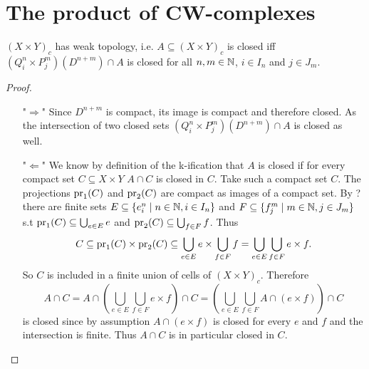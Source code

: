 \section{The product of CW-complexes}

\begin{lem}
    $(X \times Y)_c$ has weak topology,
    i.e. $A \subseteq (X \times Y)_c$ is closed iff $(Q_i^n \times P_j^m)(D^{n + m}) \cap A$ is closed for all $n, m \in \mathbb{N}$, $i \in I_n$ and $j \in J_m$.
\end{lem}
\begin{proof}~
    \begin{enumerate}
        \item["$\Rightarrow$"] Since $D^{n + m}$ is compact, its image is compact and therefore closed. As the intersection of two closed sets $(Q_i^n \times P_j^m)(D^{n + m}) \cap A$ is closed as well.
        \item["$\Leftarrow$"] We know by definition of the k-ification that $A$ is closed if for every compact set $C \subseteq X \times Y$ $A \cap C$ is closed in $C$.
        Take such a compact set $C$.
        The projections $\text{pr}_{1}(C)$ and $\text{pr}_{2}(C)$ are compact as images of a compact set. 
        By ? there are finite sets $E \subseteq \{e_i^n \mid n \in \mathbb{N}, i \in I_n \}$ and $F \subseteq \{f_j^m \mid m \in \mathbb{N}, j \in J_m \}$ s.t $\text{pr}_{1}(C) \subseteq \bigcup_{e \in E} e$ and $\text{pr}_{2}(C) \subseteq \bigcup_{f \in F} f$.
        Thus 
        \[C \subseteq \text{pr}_{1}(C) \times \text{pr}_{2}(C) \subseteq \bigcup_{e \in E} e \times \bigcup_{f \in F} f = \bigcup_{e \in E} \bigcup_{f \in F} e \times f.\] 
        So $C$ is included in a finite union of cells of $(X \times Y)_c$. 
        Therefore 
        \[A \cap C = A \cap \left (\bigcup_{e \in E} \bigcup_{f \in F} e \times f \right )\cap C = \left (\bigcup_{e \in E} \bigcup_{f \in F} A \cap (e \times f)\right ) \cap C\] 
        is closed since by assumption $A \cap (e \times f)$ is closed for every $e$ and $f$ and the intersection is finite. Thus $A \cap C$ is in particular closed in $C$.
    \qedhere
    \end{enumerate}
\end{proof}
